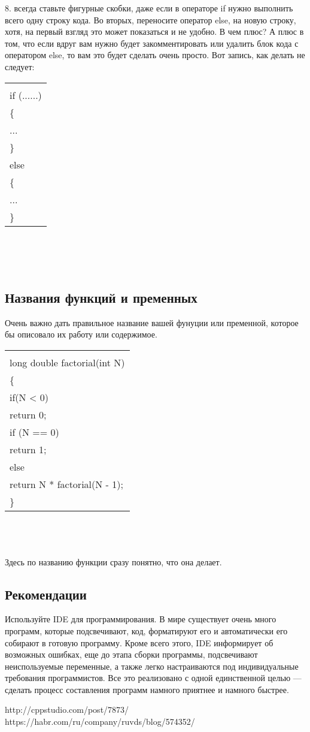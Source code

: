 \documentclass{article}
\begin{document}
8. всегда ставьте фигурные скобки, даже если в операторе if нужно выполнить всего одну строку кода. Во вторых, переносите оператор else, на новую строку, хотя, на первый взгляд это может показаться и не удобно. В чем плюс? А плюс в том, что если вдруг вам нужно будет закомментировать или удалить блок кода с оператором else, то вам это будет сделать очень просто.
Вот запись, как делать не следует:\\
\begin{tabular}{ |l|}

\hline\\
 if (......)\\
\{\\
   ...\\
\}\\
else\\
\{\\
  ...\\
\}\\
\hline
\end{tabular}\\\\\\
\subsection{Названия функций и пременных}
Очень важно дать правильное название вашей фунуции или пременной, которое бы описовало их работу или содержимое.\\
\begin{tabular}{ |l|}

\hline
 \\
long double factorial(int N)\\
\{\\
    if(N < 0) \\
        return 0; \\
    if (N == 0) \\
        return 1; \\
    else \\
        return N * factorial(N - 1);\\
\}\\
\hline
\end{tabular}\\\\\\
Здесь по названию функции сразу понятно, что она делает.
\subsection{Рекомендации}
Используйте IDE для программирования.
 В мире существует очень много программ, которые подсвечивают, код, форматируют его и автоматически его собирают в готовую программу. Кроме всего этого, IDE информирует об возможных ошибках, еще до этапа сборки программы, подсвечивают неиспользуемые переменные, а также легко настраиваются под индивидуальные требования программистов. Все это реализовано с одной единственной целью — сделать процесс составления программ намного приятнее и намного быстрее.
 \begin{thebibliography}{3}
 http://cppstudio.com/post/7873/
  https://habr.com/ru/company/ruvds/blog/574352/
\end{thebibliography}
\end{document}
